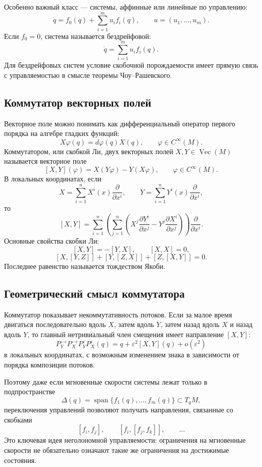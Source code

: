 \documentclass[12pt,a4paper]{article}
\newcommand{\Vect}{\operatorname{Vec}}
\begin{document}
Особенно важный класс --- системы, аффинные или линейные по управлению:
\[
\dot q=f_0(q)+\sum_{i=1}^m u_i f_i(q),\qquad u=(u_1,\ldots,u_m).
\]
Если $f_0=0$, система называется бездрейфовой:
\[
\dot q=\sum_{i=1}^m u_i f_i(q).
\]
Для бездрейфовых систем условие скобочной порождаемости имеет прямую связь с управляемостью в смысле теоремы Чоу--Рашевского.

\subsection*{Коммутатор векторных полей}
Векторное поле можно понимать как дифференциальный оператор первого порядка на алгебре гладких функций:
\[
X\varphi(q)=d\varphi(q)X(q),\qquad \varphi\in C^\infty(M).
\]
Коммутатором, или скобкой Ли, двух векторных полей $X,Y\in\Vect(M)$ называется векторное поле
\[
[X,Y](\varphi)=X(Y\varphi)-Y(X\varphi),
\qquad \varphi\in C^\infty(M).
\]
В локальных координатах, если
\[
X=\sum_{i=1}^n X^i(x)\frac{\partial}{\partial x^i},
\qquad
Y=\sum_{i=1}^n Y^i(x)\frac{\partial}{\partial x^i},
\]
то
\[
[X,Y]=\sum_{i=1}^n
\left(
\sum_{j=1}^n
\left(
X^j\frac{\partial Y^i}{\partial x^j}
-
Y^j\frac{\partial X^i}{\partial x^j}
\right)
\right)
\frac{\partial}{\partial x^i}.
\]
Основные свойства скобки Ли:
\[
[X,Y]=-[Y,X],\qquad [X,X]=0,
\]
\[
[X,[Y,Z]]+[Y,[Z,X]]+[Z,[X,Y]]=0.
\]
Последнее равенство называется тождеством Якоби.

\subsection*{Геометрический смысл коммутатора}
Коммутатор показывает некоммутативность потоков. Если за малое время двигаться последовательно вдоль $X$, затем вдоль $Y$, затем назад вдоль $X$ и назад вдоль $Y$, то главный нетривиальный член смещения имеет направление $[X,Y]$:
\[
P_Y^{-\varepsilon}P_X^{-\varepsilon}P_Y^{\varepsilon}P_X^{\varepsilon}(q)
= q+\varepsilon^2[X,Y](q)+o(\varepsilon^2)
\]
в локальных координатах, с возможным изменением знака в зависимости от порядка композиции потоков.

Поэтому даже если мгновенные скорости системы лежат только в подпространстве
\[
\Delta(q)=\operatorname{span}\{f_1(q),\ldots,f_m(q)\}\subset T_qM,
\]
переключения управлений позволяют получать направления, связанные со скобками
\[
[f_i,f_j],\qquad [f_i,[f_j,f_k]],\qquad \ldots
\]
Это ключевая идея неголономной управляемости: ограничения на мгновенные скорости не обязательно означают такие же ограничения на достижимые состояния.
\end{document}

